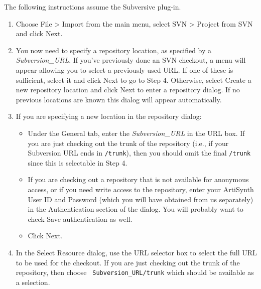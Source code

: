 \documentclass{article}
\begin{document}
The following instructions assume the Subversive plug-in.

\begin{enumerate}

\item Choose {\sf File > Import} from the main menu, select {\sf SVN >
Project from SVN} and click {\sf Next}.

\item You now need to specify a repository location, as specified by a
{\it Subversion\_URL}.  If you've previously done an SVN checkout, a
menu will appear allowing you to select a previously used URL. If one
of these is sufficient, select it and click {\sf Next} to go to Step
4. Otherwise, select {\sf Create a new repository location} and click
{\sf Next} to enter a repository dialog. If no previous locations are
known this dialog will appear automatically.

\item If you are specifying a new location in the repository dialog:

\begin{itemize}

\item Under the {\sf General} tab, enter the {\it Subversion\_URL} in the
{\sf URL} box. If you are just checking out the trunk of the
repository (i.e., if your Subversion URL ends in {\tt /trunk}), then
you should omit the final {\tt /trunk} since this is selectable in Step 4.

\item If you are checking out a repository that is not available for
anonymous access, or if you need write access to the repository, enter
your ArtiSynth User ID and Password (which you will have obtained from
us separately) in the {\sf Authentication} section of the dialog.
You will probably want to check {\sf Save authentication} as well.


\item Click {\sf Next}.

\end{itemize}

\item In the {\sf Select Resource} dialog, use the {\sf URL} selector
box to select the full URL to be used for the checkout. If you are
just checking out the trunk of the repository, then choose {\tt
Subversion\_URL/trunk} which should be available as a selection.


\end{enumerate}
\end{document}
